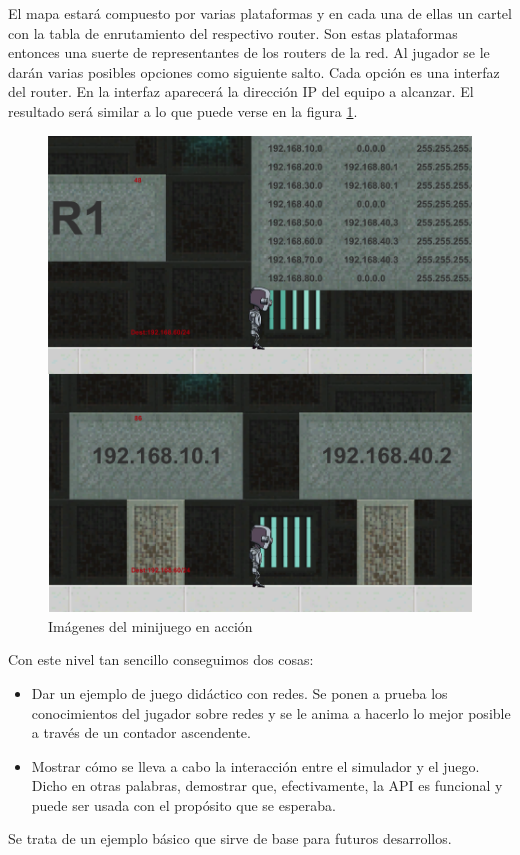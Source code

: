 El mapa estará compuesto por varias plataformas y en cada una de ellas un cartel con la tabla de enrutamiento del respectivo router. Son estas plataformas entonces una suerte de representantes de los routers de la red. Al jugador se le darán varias posibles opciones como siguiente salto. Cada opción es una interfaz del router. En la interfaz aparecerá la dirección IP del equipo a alcanzar. El resultado será similar a lo que puede verse en la figura \ref{fig:juegoaccion}.

\begin{figure}[H]
  \centering
  \includegraphics[scale=0.1]{imagenes/juegoaccion}
  \caption{Imágenes del minijuego en acción}
  \label{fig:juegoaccion}
\end{figure}

Con este nivel tan sencillo conseguimos dos cosas:
\begin{itemize}
\item Dar un ejemplo de juego didáctico con redes. Se ponen a prueba los conocimientos del jugador sobre redes y se le anima a hacerlo lo mejor posible a través de un contador ascendente.
\item Mostrar cómo se lleva a cabo la interacción entre el simulador y el juego. Dicho en otras palabras, demostrar que, efectivamente, la API es funcional y puede ser usada con el propósito que se esperaba.
\end{itemize}

Se trata de un ejemplo básico que sirve de base para futuros desarrollos. 